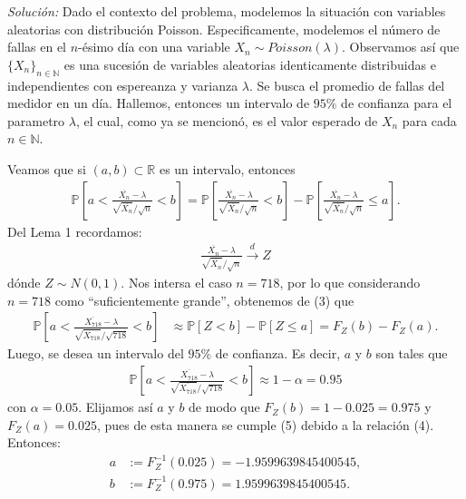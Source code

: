 \documentclass[letterpaper, 12pt]{article}
\newcommand{\R}{\mathbb{R}}
\newcommand{\N}{\mathbb{N}}
\renewcommand{\P}{\mathbb{P}}
\newcommand{\pac}[1]{\left[#1\right]}
\newcommand{\iden}{\setlength{\parindent}{12pt}}
\newcommand{\solin}{\iden\textit{Solución: }}
\begin{document}
\solin Dado el contexto del problema, modelemos la situación con variables aleatorias con distribución Poisson. Especificamente, modelemos el número de fallas en el $n$-ésimo día con una variable $X_n\sim Poisson(\lambda)$. Observamos así que $\{X_n\}_{n\in \N}$ es una sucesión de variables aleatorias identicamente distribuidas e independientes con espereanza y varianza $\lambda$. Se busca el promedio de fallas del medidor en un día. Hallemos, entonces un intervalo de $95\%$ de confianza para el parametro $\lambda$, el cual, como ya se mencionó, es el valor esperado de $X_n$ para cada $n\in \N$.

Veamos que si $(a, b)\subset \R$ es un intervalo, entonces 
\begin{align}
    \P\left[a < \frac{\overline{X_n}-\lambda}{\sqrt{\overline{X_n}}/\sqrt{n}} < b \right] = 
    \P\pac{\frac{\overline{X_n}-\lambda}{\sqrt{\overline{X_n}}/\sqrt{n}} < b } - \P\pac{\frac{\overline{X_n}-\lambda}{\sqrt{\overline{X_n}}/\sqrt{n}} \leq a}.
\end{align}
Del Lema 1 recordamos:
\begin{align*}
    \frac{\overline{X_n}-\lambda}{\sqrt{\overline{X_n}}/\sqrt{n}} \overset{d}{\to} Z
\end{align*}
dónde $Z\sim N(0, 1)$.  Nos intersa el caso $n=718$, por lo que considerando $n=718$ como ``suficientemente grande'', obtenemos de (3) que
\begin{align}
    \P\left[a < \frac{\overline{X_{718}}-\lambda}{\sqrt{\overline{X_{718}}}/\sqrt{718}} < b \right]  
    &\approx \P[Z < b] - \P[Z \leq a] = F_Z(b) - F_Z(a).
\end{align}
Luego, se desea un intervalo del $95\%$ de confianza. Es decir, $a$ y $b$ son tales que 
\begin{align}
    \P\left[a < \frac{\overline{X_{718}}-\lambda}{\sqrt{\overline{X_{718}}}/\sqrt{718}} < b \right] \approx 1-\alpha = 0.95
\end{align}
con $\alpha = 0.05$. Elijamos así $a$ y $b$ de modo que $F_Z(b) = 1-0.025 = 0.975$ y $F_Z(a)=0.025$, pues de esta manera se cumple (5) debido a la relación (4). Entonces:
\begin{align*}
    a &:= F_Z^{-1}(0.025) = -1.9599639845400545,\\
    b &:= F_Z^{-1}(0.975) = 1.9599639845400545.
\end{align*}
\end{document}
